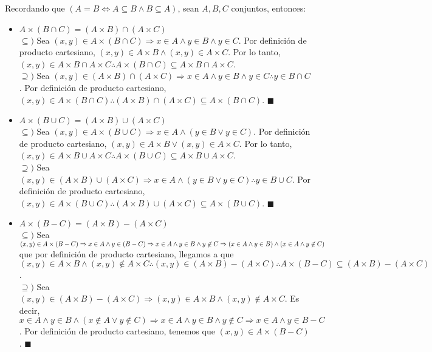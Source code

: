 \documentclass[11pt,a4paper]{article}
\newcommand*{\QEDA}{\null\nobreak\hfill\ensuremath{\blacksquare}}
\begin{document}
\noindent Recordando que $(A=B \iff A\subseteq B \land B\subseteq A)$, sean $A,B, C$ conjuntos, entonces:
\begin{itemize}
\item $A \times (B \cap C) = (A \times B) \cap (A \times C)$\\
$\subseteq)$ Sea $(x,y) \in A \times (B \cap C) \Rightarrow x \in A \land y \in B \land y \in C$. Por definici\'on de producto cartesiano, $(x,y) \in A\times B \land (x,y)\in A\times C$. Por lo tanto, $(x,y) \in A \times B \cap A \times C \therefore A \times (B \cap C) \subseteq A \times B \cap A \times C$.\\
$\supseteq)$ Sea $(x,y) \in (A\times B) \cap (A\times C) \Rightarrow x \in A \land y \in B \land y \in C \therefore y \in B\cap C$. Por definici\'on de producto cartesiano, $(x,y) \in A \times (B \cap C) \therefore (A\times B) \cap (A \times C) \subseteq A \times (B \cap C)$. \QEDA
\item $A \times (B \cup C) = (A \times B) \cup (A \times C)$\\
$\subseteq)$ Sea $(x,y) \in A \times (B \cup C) \Rightarrow x \in A \land (y \in B \lor y \in C)$. Por definici\'on de producto cartesiano, $(x,y) \in A\times B \lor (x,y)\in A\times C$. Por lo tanto, $(x,y) \in A \times B \cup A \times C \therefore A \times (B \cup C) \subseteq A \times B \cup A \times C$.\\
$\supseteq)$ Sea $(x,y) \in (A\times B) \cup (A\times C) \Rightarrow x \in A \land (y \in B \lor y \in C) \therefore y \in B\cup C$. Por definici\'on de producto cartesiano, $(x,y) \in A \times (B \cup C) \therefore (A\times B) \cup (A \times C) \subseteq A \times (B \cup C)$. \QEDA
\item $A \times (B - C) = (A \times B) - (A \times C)$\\
$\subseteq) $ Sea $(x,y) \in A \times (B - C) \Rightarrow x \in A \land y \in (B - C) \Rightarrow x \in A \land y \in B \land y \not \in C \Rightarrow\\ (x \in A \land y \in B) \land (x \in A \land y \not \in C)$ que por definici\'on de producto cartesiano, llegamos a que $(x,y) \in A \times B \land (x,y) \not \in A \times C \therefore (x,y) \in (A \times B) - (A \times C) \therefore A \times (B - C) \subseteq (A \times B) - (A \times C)$.\\
$\supseteq) $ Sea $(x,y) \in (A \times B) - (A \times C) \Rightarrow (x,y) \in A\times B \land (x,y) \not \in A \times C$. Es decir, \\$x \in A \land y \in B \land (x \not \in A \lor y \not \in C) \Rightarrow x \in A \land y \in B \land y \not \in C \Rightarrow x \in A \land y \in B - C$. Por definici\'on de producto cartesiano, tenemos que $(x,y) \in A \times (B - C)$. \QEDA

\end{itemize}
\end{document}
